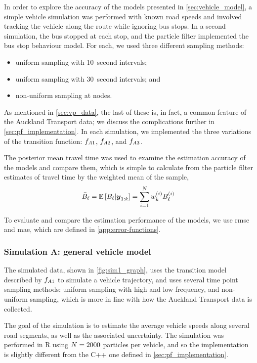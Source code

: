 In order to explore the accuracy of the models presented in \cref{sec:vehicle_model}, a simple vehicle simulation was performed with known road speeds and involved tracking the vehicle along the route while ignoring bus stops. In a second simulation, the bus stopped at each stop, and the particle filter implemented the bus stop behaviour model. For each, we used three different sampling methods:
\begin{itemize}
\item uniform sampling with 10~second intervals;
\item uniform sampling with 30~second intervals; and
\item non-uniform sampling at nodes.
\end{itemize}
As mentioned in \cref{sec:vp_data}, the last of these is, in fact, a common feature of the Auckland Transport data; we discuss the complications further in \cref{sec:pf_implementation}. In each simulation, we implemented the three variations of the transition function: $f_{A1}$, $f_{A2}$, and $f_{A3}$.


The posterior mean travel time was used
to examine the estimation accuracy of the models and compare them,
which is simple to calculate from the particle filter estimates of travel time by
the weighted mean of the sample,
\begin{equation}
\label{eq:pf_travel_time_mean}
\bar{B}_\ell =
\mathbb{E}\left[B_\ell | \boldsymbol{y}_{1:k}\right] =
\sum_{i=1}^N w^{(i)}_k B^{(i)}_\ell
\end{equation}


To evaluate and compare the estimation performance of the models, we use \gls{rmse} and \gls{mae}, which are defined in \cref{app:error-functions}.


\subsubsection{Simulation A: general vehicle model}
\label{sec:vehicle_sim_A}





The simulated data, shown in \cref{fig:sim1_graph}, uses the transition model described by $f_{A1}$ to simulate a vehicle trajectory, and uses several time point sampling methods: uniform sampling with high and low frequency, and non-uniform sampling, which is more in line with how the Auckland Transport data is collected.


The goal of the simulation is to estimate the average vehicle speeds along several road segments, as well as the associated uncertainty. The simulation was performed in R \citep{rcore} using $N = 2000$ particles per vehicle, and so the implementation is slightly different from the C++ one defined in \cref{sec:pf_implementation}.

